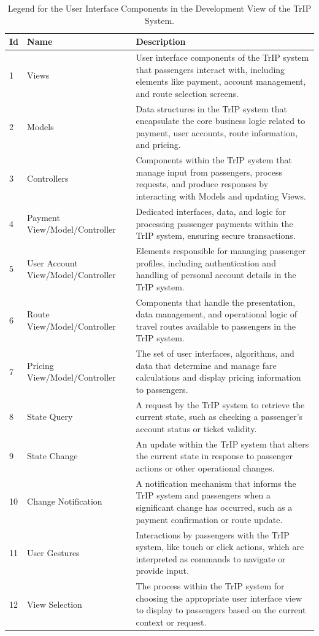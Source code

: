 \begin{table}[H]
    \centering
    \caption{Legend for the User Interface Components in the Development View of the TrIP System.}
    \label{tab:trip_system_ui_development_legend}
    \begin{tabular}{@{}llp{10cm}@{}}
    \toprule
    \textbf{Id} & \textbf{Name} & \textbf{Description} \\
    \midrule
    1 & Views & User interface components of the TrIP system that passengers interact with, including elements like payment, account management, and route selection screens. \\
    2 & Models & Data structures in the TrIP system that encapsulate the core business logic related to payment, user accounts, route information, and pricing. \\
    3 & Controllers & Components within the TrIP system that manage input from passengers, process requests, and produce responses by interacting with Models and updating Views. \\
    4 & Payment View/Model/Controller & Dedicated interfaces, data, and logic for processing passenger payments within the TrIP system, ensuring secure transactions. \\
    5 & User Account View/Model/Controller & Elements responsible for managing passenger profiles, including authentication and handling of personal account details in the TrIP system. \\
    6 & Route View/Model/Controller & Components that handle the presentation, data management, and operational logic of travel routes available to passengers in the TrIP system. \\
    7 & Pricing View/Model/Controller & The set of user interfaces, algorithms, and data that determine and manage fare calculations and display pricing information to passengers. \\
    8 & State Query & A request by the TrIP system to retrieve the current state, such as checking a passenger's account status or ticket validity. \\
    9 & State Change & An update within the TrIP system that alters the current state in response to passenger actions or other operational changes. \\
    10 & Change Notification & A notification mechanism that informs the TrIP system and passengers when a significant change has occurred, such as a payment confirmation or route update. \\
    11 & User Gestures & Interactions by passengers with the TrIP system, like touch or click actions, which are interpreted as commands to navigate or provide input. \\
    12 & View Selection & The process within the TrIP system for choosing the appropriate user interface view to display to passengers based on the current context or request. \\
    \bottomrule
    \end{tabular}
\end{table}
